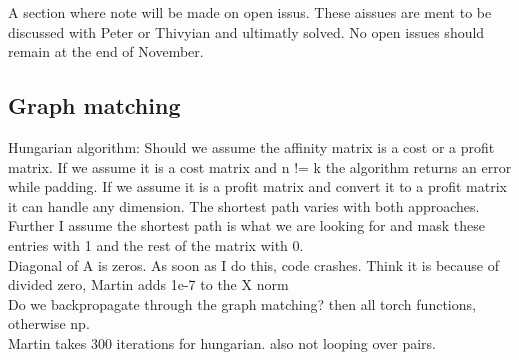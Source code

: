 A section where note will be made on open issus. These aissues are ment to be discussed with Peter or Thivyian and ultimatly solved. No open issues should remain at the end of November.


\subsection{Graph matching}


Hungarian algorithm:
Should we assume the affinity matrix is a cost or a profit matrix. If we assume it is a cost matrix and n != k the algorithm returns an error while padding. If we assume it is a profit matrix and convert it to a profit matrix it can handle any dimension. The shortest path varies with both approaches.
Further I assume the shortest path is what we are looking for and mask these entries with 1 and the rest of the matrix with 0.
\\
Diagonal of A is zeros. As soon as I do this, code crashes. Think it is because of divided zero, Martin adds 1e-7 to the X norm
\\
Do we backpropagate through the graph matching? then all torch functions, otherwise np.
\\
Martin takes 300 iterations for hungarian. also not looping over pairs.